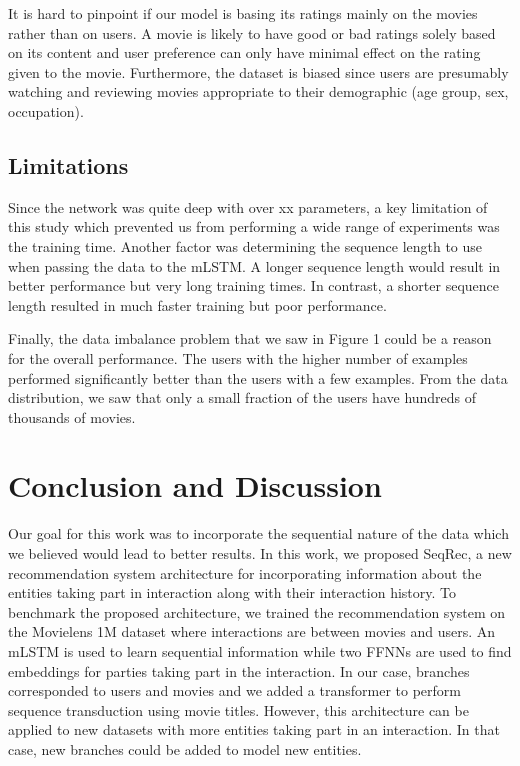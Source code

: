 \documentclass{bioinfo}
\begin{document}
It is hard to pinpoint if our model is basing its ratings mainly on the movies rather than on users. A movie is likely to have good or bad ratings solely based on its content and user preference can only have minimal effect on the rating given to the movie. Furthermore, the dataset is biased since users are presumably watching and reviewing movies appropriate to their demographic (age group, sex, occupation).



\subsection{Limitations}

Since the network was quite deep with over xx parameters, a key limitation of this study which prevented us from performing a wide range of experiments was the training time. Another factor was determining the sequence length to use when passing the data to the mLSTM. A longer sequence length would result in better performance but very long training times. In contrast, a shorter sequence length resulted in much faster training but poor performance.

Finally, the data imbalance problem that we saw in Figure 1 could be a reason for the overall performance. The users with the higher number of examples performed significantly better than the users with a few examples. From the data distribution, we saw that only a small fraction of the users have hundreds of thousands of movies.

\section{Conclusion and Discussion}
Our goal for this work was to incorporate the sequential nature of the data which we believed would lead to better results. In this work, we proposed SeqRec, a new recommendation system architecture for incorporating information about the entities taking part in interaction along with their interaction history. To benchmark the proposed architecture, we trained the recommendation system on the Movielens 1M dataset where interactions are between movies and users. An mLSTM is used to learn sequential information while two FFNNs are used to find embeddings for parties taking part in the interaction. In our case, branches corresponded to users and movies and we added a transformer to perform sequence transduction using movie titles. However, this architecture can be applied to new datasets with more entities taking part in an interaction. In that case, new branches could be added to model new entities. 
\end{document}
